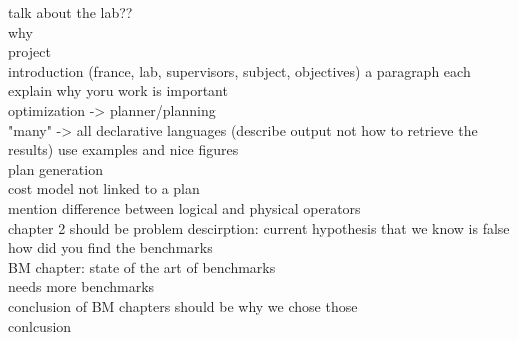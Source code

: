 talk about the lab??\\
why\\
project\\
introduction (france, lab, supervisors, subject, objectives) a paragraph each
explain why yoru work is important\\
optimization -> planner/planning\\
"many" -> all declarative languages (describe output not how to retrieve the results)
use examples and nice figures\\
plan generation\\
cost model not linked to a plan\\
mention difference between logical and physical operators\\
chapter 2 should be problem descirption: current hypothesis that we know is false\\
how did you find the benchmarks\\
BM chapter: state of the art of benchmarks\\
needs more benchmarks\\
conclusion of BM chapters should be why we chose those\\
conlcusion\\
